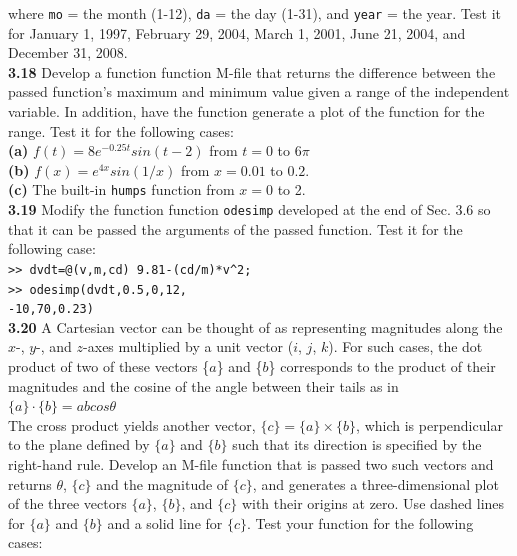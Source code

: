 \documentclass[../main.tex]{subfiles}
\begin{document}
\begin{multicols}{2}
    \noindent where \texttt{mo} = the month (1-12), \texttt{da} = the day (1-31), and
    \texttt{year} = the year. Test it for January 1, 1997, February 29,
    2004, March 1, 2001, June 21, 2004, and December 31, 2008.\\

    \noindent\textbf{3.18} Develop a function function M-file that returns the difference
    between the passed function's maximum and minimum
    value given a range of the independent variable. In
    addition, have the function generate a plot of the function for
    the range. Test it for the following cases:\\

    \noindent
    \textbf{(a)} $f(t)=8e^{-0.25t}sin(t-2)$ from $t=0$ to $6\pi$\\
    \textbf{(b)} $f(x)=e^{4x}sin(1/x)$ from $x=0.01$ to $0.2$.\\
    \textbf{(c)} The built-in \texttt{humps} function from $x=0$ to 2.\\

    \noindent\textbf{3.19} Modify the function function \texttt{odesimp} developed at
    the end of Sec. 3.6 so that it can be passed the arguments of
    the passed function. Test it for the following case:\\

    \texttt{>> dvdt=@(v,m,cd) 9.81-(cd/m)*v\textasciicircum2;\\
    \indent >> odesimp(dvdt,0.5,0,12,\\
    \indent\hspace{40mm}-10,70,0.23)}\\

    \noindent\textbf{3.20} A Cartesian vector can be thought of as representing
    magnitudes along the $x$-, $y$-, and $z$-axes multiplied by a unit
    vector ($i$, $j$, $k$). For such cases, the dot product of two of these
    vectors \{$a$\} and \{$b$\} corresponds to the product of their magnitudes
    and the cosine of the angle between their tails as in\\

    $\{a\}\cdot \{b\} = abcos\theta$\\

    \noindent The cross product yields another vector, $\{c\} = \{a\} \times \{b\}$,
    which is perpendicular to the plane defined by $\{a\}$ and $\{b\}$
    such that its direction is specified by the right-hand rule.
    Develop an M-file function that is passed two such vectors
    and returns $\theta$, $\{c\}$ and the magnitude of $\{c\}$, and generates a
    three-dimensional plot of the three vectors $\{a\}$, $\{b\}$, and $\{c\}$
    with their origins at zero. Use dashed lines for $\{a\}$ and $\{b\}$
    and a solid line for $\{c\}$. Test your function for the following
    cases:\\


\end{multicols}
\end{document}
